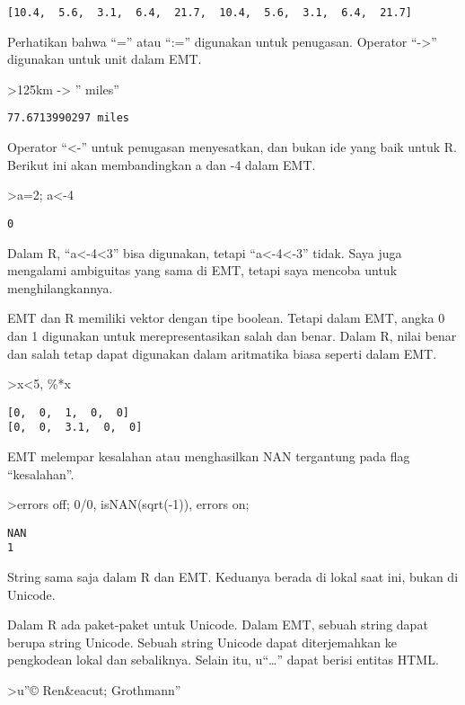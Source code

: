 \documentclass[
]{book}
\begin{document}
\begin{verbatim}
[10.4,  5.6,  3.1,  6.4,  21.7,  10.4,  5.6,  3.1,  6.4,  21.7]
\end{verbatim}

Perhatikan bahwa ``='' atau ``:='' digunakan untuk penugasan. Operator ``-\textgreater{}'' digunakan untuk unit dalam EMT.

\textgreater125km -\textgreater{} '' miles''

\begin{verbatim}
77.6713990297 miles
\end{verbatim}

Operator ``\textless-'' untuk penugasan menyesatkan, dan bukan ide yang baik untuk R. Berikut ini akan membandingkan a dan -4 dalam EMT.

\textgreater a=2; a\textless-4

\begin{verbatim}
0
\end{verbatim}

Dalam R, ``a\textless-4\textless3'' bisa digunakan, tetapi ``a\textless-4\textless-3'' tidak. Saya juga mengalami ambiguitas yang sama di EMT, tetapi saya mencoba untuk menghilangkannya.

EMT dan R memiliki vektor dengan tipe boolean. Tetapi dalam EMT, angka 0 dan 1 digunakan untuk merepresentasikan salah dan benar. Dalam R, nilai benar dan salah tetap dapat digunakan dalam aritmatika biasa seperti dalam EMT.

\textgreater x\textless5, \%*x

\begin{verbatim}
[0,  0,  1,  0,  0]
[0,  0,  3.1,  0,  0]
\end{verbatim}

EMT melempar kesalahan atau menghasilkan NAN tergantung pada flag ``kesalahan''.

\textgreater errors off; 0/0, isNAN(sqrt(-1)), errors on;

\begin{verbatim}
NAN
1
\end{verbatim}

String sama saja dalam R dan EMT. Keduanya berada di lokal saat ini, bukan di Unicode.

Dalam R ada paket-paket untuk Unicode. Dalam EMT, sebuah string dapat berupa string Unicode. Sebuah string Unicode dapat diterjemahkan ke pengkodean lokal dan sebaliknya. Selain itu, u``\ldots'' dapat berisi entitas HTML.

\textgreater u''© Ren\&eacut; Grothmann''
\end{document}
